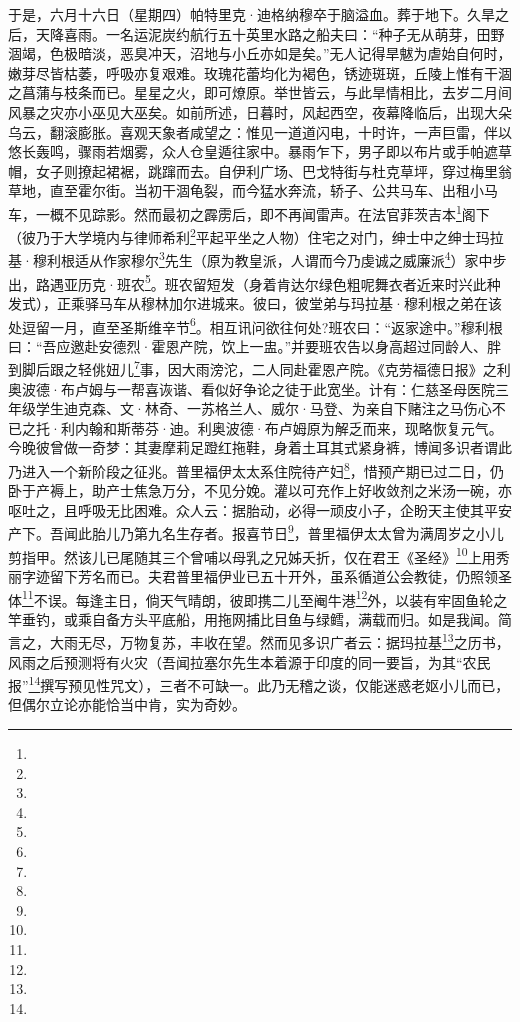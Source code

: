 \par 于是，六月十六日（星期四）帕特里克·迪格纳穆卒于脑溢血。葬于地下。久旱之后，天降喜雨。一名运泥炭约航行五十英里水路之船夫曰：“种子无从萌芽，田野涸竭，色极暗淡，恶臭冲天，沼地与小丘亦如是矣。”无人记得旱魃为虐始自何时，嫩芽尽皆枯萎，呼吸亦复艰难。玫瑰花蕾均化为褐色，锈迹斑斑，丘陵上惟有干涸之菖蒲与枝条而已。星星之火，即可燎原。举世皆云，与此旱情相比，去岁二月间风暴之灾亦小巫见大巫矣。如前所述，日暮时，风起西空，夜幕降临后，出现大朵乌云，翻滚膨胀。喜观天象者咸望之：惟见一道道闪电，十时许，一声巨雷，伴以悠长轰鸣，骤雨若烟雾，众人仓皇遁往家中。暴雨乍下，男子即以布片或手帕遮草帽，女子则撩起裙裾，跳蹿而去。自伊利广场、巴戈特街与杜克草坪，穿过梅里翁草地，直至霍尔街。当初干涸龟裂，而今猛水奔流，轿子、公共马车、出租小马车，一概不见踪影。然而最初之霹雳后，即不再闻雷声。在法官菲茨吉本\footnote{}阁下（彼乃于大学境内与律师希利\footnote{}平起平坐之人物）住宅之对门，绅士中之绅士玛拉基·穆利根适从作家穆尔\footnote{}先生（原为教皇派，人谓而今乃虔诚之威廉派\footnote{}）家中步出，路遇亚历克·班农\footnote{}。班农留短发（身着肯达尔绿色粗呢舞衣者近来时兴此种发式），正乘驿马车从穆林加尔进城来。彼曰，彼堂弟与玛拉基·穆利根之弟在该处逗留一月，直至圣斯维辛节\footnote{}。相互讯问欲往何处?班农曰：“返家途中。”穆利根曰：“吾应邀赴安德烈·霍恩产院，饮上一盅。”并要班农告以身高超过同龄人、胖到脚后跟之轻佻妞儿\footnote{}事，因大雨滂沱，二人同赴霍恩产院。《克劳福德日报》之利奥波德·布卢姆与一帮喜诙谐、看似好争论之徒于此宽坐。计有：仁慈圣母医院三年级学生迪克森、文·林奇、一苏格兰人、威尔·马登、为亲自下赌注之马伤心不已之托·利内翰和斯蒂芬·迪。利奥波德·布卢姆原为解乏而来，现略恢复元气。今晚彼曾做一奇梦：其妻摩莉足蹬红拖鞋，身着土耳其式紧身裤，博闻多识者谓此乃进入一个新阶段之征兆。普里福伊太太系住院待产妇\footnote{}，惜预产期已过二日，仍卧于产褥上，助产士焦急万分，不见分娩。灌以可充作上好收敛剂之米汤一碗，亦呕吐之，且呼吸无比困难。众人云：据胎动，必得一顽皮小子，企盼天主使其平安产下。吾闻此胎儿乃第九名生存者。报喜节日\footnote{}，普里福伊太太曾为满周岁之小儿剪指甲。然该儿已尾随其三个曾哺以母乳之兄姊夭折，仅在君王《圣经》\footnote{}上用秀丽字迹留下芳名而已。夫君普里福伊业已五十开外，虽系循道公会教徒，仍照领圣体\footnote{}不误。每逢主日，倘天气晴朗，彼即携二儿至阉牛港\footnote{}外，以装有牢固鱼轮之竿垂钓，或乘自备方头平底船，用拖网捕比目鱼与绿鳕，满载而归。如是我闻。简言之，大雨无尽，万物复苏，丰收在望。然而见多识广者云：据玛拉基\footnote{}之历书，风雨之后预测将有火灾（吾闻拉塞尔先生本着源于印度的同一要旨，为其“农民报”\footnote{}撰写预见性咒文），三者不可缺一。此乃无稽之谈，仅能迷惑老妪小儿而已，但偶尔立论亦能恰当中肯，实为奇妙。

